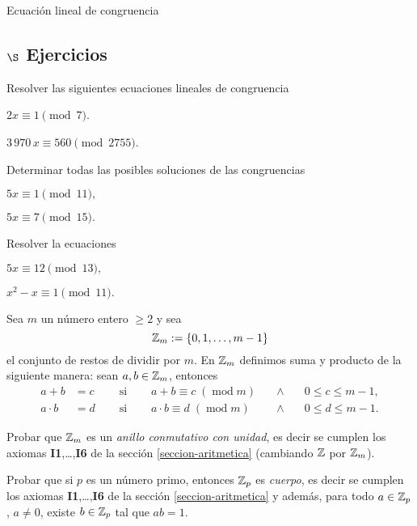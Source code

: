 \begin{section}{Ecuación lineal de congruencia}
\subsection*{$\S$ Ejercicios}

\begin{enumex}
    \item Resolver las siguientes ecuaciones lineales de congruencia
    \begin{enumex}
        \item $2x \equiv 1 \pmod{7}$.
        \item $3\,970\, x \equiv 560 \pmod{2755}$.
    \end{enumex}


\item Determinar todas las posibles soluciones de las congruencias
\begin{enumex}
    \item  $5x\equiv1 \pmod{11},$
    
    \item  $5x\equiv 7 \pmod{15}.$
\end{enumex}
\item Resolver la ecuaciones
\begin{enumex}
\item $5x\equiv12 \pmod{13},$

\item $x^2-x \equiv 1 \pmod{11}.$
\end{enumex}

    \item\label{ejercicio-zm}  Sea $m$ un número entero $\ge 2$ y sea
    $$
    {\mathbb Z}_m := \{0,1,\ldots, m-1\}
    $$
    el conjunto de restos de dividir por $m$. En ${\mathbb Z}_m$ definimos suma y producto de la siguiente manera: sean $a,b \in {\mathbb Z}_m$,  entonces  
    \begin{equation*}
        \begin{array}{llllll}
            a+b &= c\quad &\text{ si }\quad &a+b \equiv c \; (\operatorname{mod}m) \quad&\wedge\quad&0 \le c \le m-1,\\
            a \cdot b &= d\quad &\text{ si }\quad &a\cdot b \equiv d \; (\operatorname{mod}m) &\wedge& 0 \le d \le m-1.
        \end{array} 
    \end{equation*}
    \begin{enumex}
        \item Probar que ${\mathbb Z}_m$ es un  \textit{anillo conmutativo con unidad},  es decir se cumplen los axiomas \textbf{I1},\ldots,\textbf{I6} de la sección \ref{seccion-aritmetica} (cambiando ${\mathbb Z}$ por  ${\mathbb Z}_m$). 
        \item Probar que si $p$ es un número primo,  entonces ${\mathbb Z}_p$ es \textit{cuerpo}, es decir  se cumplen los axiomas \textbf{I1},\ldots,\textbf{I6} de la sección \ref{seccion-aritmetica} y además, para todo $a \in {\mathbb Z}_p$, $a\ne 0$, existe $b \in {\mathbb Z}_p$ tal que $ab =1$. 
    \end{enumex}
\end{enumex}

\end{section}



